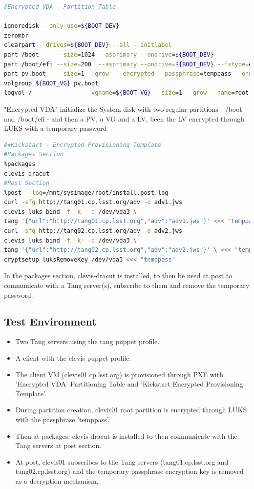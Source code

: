 \vskip 0.5cm
\begin{lstlisting}[language=bash]
#Encrypted VDA - Partition Table

ignoredisk --only-use=${BOOT_DEV}
zerombr
clearpart --drives=${BOOT_DEV} --all --initlabel
part /boot     --size=1024 --asprimary --ondrive=${BOOT_DEV}
part /boot/efi --size=200  --asprimary --ondrive=${BOOT_DEV} --fstype=efi
part pv.boot   --size=1 --grow  --encrypted --passphrase=temppass --ondisk=${BOOT_DEV}
volgroup ${BOOT_VG} pv.boot
logvol /               --vgname=${BOOT_VG} --size=1 --grow --name=root
\end{lstlisting}

"Encrypted VDA" initialize the System disk with two regular partitions - /boot and /boot/efi - and then a PV, a VG and a LV, been the LV encrypted through LUKS with a temporary password
\begin{lstlisting}[language=bash]
##Kickstart - Encrypted Provisioning Template
#Packages Section
%packages
clevis-dracut
#Post Section
%post --log=/mnt/sysimage/root/install.post.log
curl -sfg http://tang01.cp.lsst.org/adv -o adv1.jws
clevis luks bind -f -k- -d /dev/vda3 \
tang '{"url":"http://tang01.cp.lsst.org","adv":"adv1.jws"}' <<< "temppass"
curl -sfg http://tang02.cp.lsst.org/adv -o adv2.jws
clevis luks bind -f -k- -d /dev/vda3 \
tang '{"url":"http://tang02.cp.lsst.org","adv":"adv2.jws"}' \ <<< "temppass"
cryptsetup luksRemoveKey /dev/vda3 <<< "temppass"
\end{lstlisting}

In the packages section, clevis-dracut is installed, to then be used at post to communicate with a Tang server(s), subscribe to them and remove the temporary password.

\newpage
\subsection{Test Environment}
\begin{itemize}
  \item Two Tang servers using the tang puppet profile.
  \item A client with the clevis puppet profile.
  \item The client VM (clevis01.cp.lsst.org) is provisioned through PXE with 'Encrypted VDA' Partitioning Table and 'Kickstart Encrypted Provisioning Template'.
  \item During partition creation, clevis01 root partition is encrypted through LUKS with the passphrase 'temppass'.
  \item Then at packages, clevis-dracut is installed to then communicate with the Tang servers at post section.
  \item At post, clevis01 subscribes to the Tang servers (tang01.cp.lsst.org and tang02.cp.lsst.org) and the temporary passphrase encryption key is removed as a decryption mechanism.
\end{itemize}

